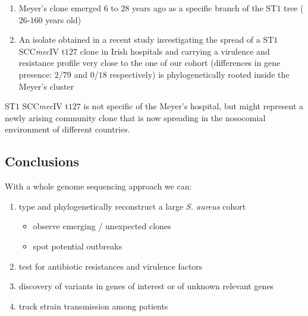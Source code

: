 \begin{enumerate}
    \item Meyer's clone emerged $6$ to $28$ years ago as a specific branch of the ST$1$ tree ($26$-$160$ years old)
    \item An isolate obtained in a recent study investigating the spread of a ST$1$ SCC\emph{mec}IV t$127$ clone in Irish hospitals and carrying a virulence and resistance profile very close to the one of our cohort (differences in gene presence: $2$/$79$ and $0$/$18$ respectively) is phylogenetically  rooted inside the Meyer's cluster
\end{enumerate}

ST$1$ SCC\emph{mec}IV t$127$ is not specific of the Meyer's hospital, but might represent a newly arising community clone that is now spreading in the nosocomial environment of different countries. 

\subsection{Conclusions}

With a whole genome sequencing approach we can:

\begin{enumerate}
    \item type and phylogenetically reconstruct a large \emph{S. aureus} cohort
    \begin{itemize}
        \item observe emerging / unexpected clones
        \item spot potential outbreaks
    \end{itemize}
    \item test for antibiotic resistances and virulence factors
    \item discovery of variants in genes of interest or of unknown relevant genes
    \item track strain transmission among patients
\end{enumerate}
